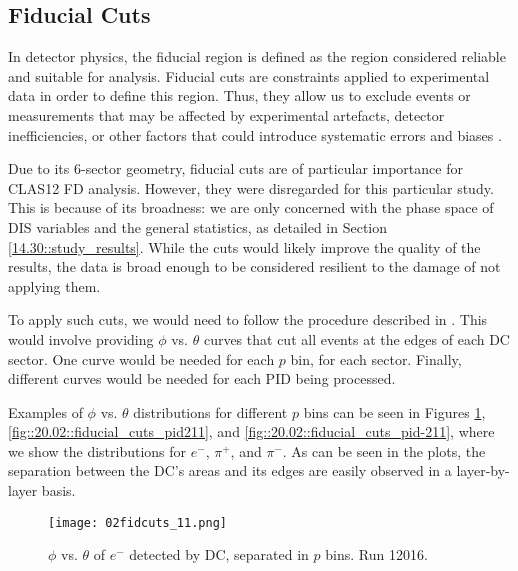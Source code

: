 \subsection{Fiducial Cuts}
\label{20.02::fiducial_cuts}
    In detector physics, the fiducial region is defined as the region considered reliable and suitable for analysis.
    Fiducial cuts are constraints applied to experimental data in order to define this region.
    Thus, they allow us to exclude events or measurements that may be affected by experimental artefacts, detector inefficiencies, or other factors that could introduce systematic errors and biases \cite{leo1987}.

    Due to its 6-sector geometry, fiducial cuts are of particular importance for CLAS12 FD analysis.
    However, they were disregarded for this particular study.
    This is because of its broadness: we are only concerned with the phase space of DIS variables and the general statistics, as detailed in Section \ref{14.30::study_results}.
    While the cuts would likely improve the quality of the results, the data is broad enough to be considered resilient to the damage of not applying them.

    To apply such cuts, we would need to follow the procedure described in \cite{zana2010}.
    This would involve providing $\phi$ vs. $\theta$ curves that cut all events at the edges of each DC sector.
    One curve would be needed for each $p$ bin, for each sector.
    Finally, different curves would be needed for each PID being processed.

    Examples of $\phi$ vs. $\theta$ distributions for different $p$ bins can be seen in Figures \ref{fig::20.02::fiducial_cuts_pid11}, \ref{fig::20.02::fiducial_cuts_pid211}, and \ref{fig::20.02::fiducial_cuts_pid-211}, where we show the distributions for $e^-$, $\pi^+$, and $\pi^-$.
    As can be seen in the plots, the separation between the DC's areas and its edges are easily observed in a layer-by-layer basis.

    \begin{figure}[b!]
        \centering
        \texttt{[image: 02fidcuts\_11.png]}
        \caption[$\phi$ vs. $\theta$ of $e^-$ in $p$ bins]
        {$\phi$ vs. $\theta$ of $e^-$ detected by DC, separated in $p$ bins.
        Run 12016.}
        \label{fig::20.02::fiducial_cuts_pid11}
    \end{figure}

